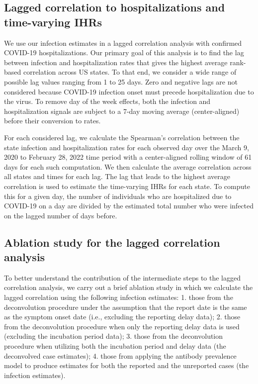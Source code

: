 \documentclass{article}
\begin{document}
\subsection{Lagged correlation to hospitalizations and time-varying IHRs} 

We use our infection estimates in a lagged correlation analysis with
confirmed COVID-19 hospitalizations. Our primary goal of this analysis is to
find the lag between infection and hospitalization rates that gives the highest
average rank-based correlation across US states. To that end, we consider a wide
range of possible lag values ranging from 1 to 25 days. Zero and negative
lags are not considered because COVID-19 infection onset must precede
hospitalization due to the virus. To remove day of the week effects, both the
infection and hospitalization signals are subject to a 7-day moving
average (center-aligned) before their conversion to rates.

For each considered lag, we calculate the Spearman's correlation between the 
state infection and hospitalization rates for each observed day 
over the March 9, 2020 to February 28, 2022
time period %
with a center-aligned rolling window of 61 days for each such computation.
We then calculate the average correlation across all states and times for each lag. 
The lag that leads to the highest average correlation is used to estimate 
the time-varying IHRs for each
state. To compute this for a given day, the number of individuals who are
hospitalized due to COVID-19 on a day are divided by the estimated total number
who were infected on the lagged number of days before.

\subsection{Ablation study for the lagged correlation analysis} 

To better understand the contribution of the intermediate steps to the lagged 
correlation analysis, we carry out a brief ablation study in which we calculate the 
lagged correlation using the following infection estimates: 1. those from the
deconvolution procedure under the assumption that the report date is the 
same as the symptom onset date (i.e., excluding
the reporting delay data); 2. those from the deconvolution procedure when only the
reporting delay data is used (excluding the incubation period data); 3. those from
the deconvolution procedure when utilizing both the incubation period and delay data 
(the deconvolved case estimates); 4. those from applying the antibody prevalence 
model to produce estimates for both the reported and the unreported 
cases (the infection estimates).
\end{document}
